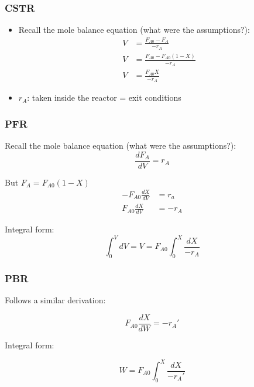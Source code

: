 \begin{frame}\frametitle{CSTR}
	\begin{itemize}
		\item	Recall the mole balance equation (what were the assumptions?):
				\begin{align*}
					V &= \frac{F_{A0} - F_A}{-r_A}\\
					V &= \frac{F_{A0} - F_{A0}(1 - X)}{-r_A} \\
					V &= \frac{F_{A0}X}{-r_A}
				\end{align*}
		\item	$r_A$: taken inside the reactor = exit conditions
	\end{itemize}
	{}
\end{frame}

\begin{frame}\frametitle{PFR}
	Recall the mole balance equation (what were the assumptions?):
	$$\frac{dF_A}{dV} = r_A$$

	But $F_A = F_{A0}(1 - X)$
	\begin{align*}
		-F_{A0}\frac{dX}{dV} &= r_a\\
		F_{A0}\frac{dX}{dV}&=-r_A
	\end{align*}

	Integral form:
	\vspace{-6pt}
	$$\int_0^VdV = V = F_{A0}\int_0^X\frac{dX}{-r_A}$$
	{}
\end{frame}

\begin{frame}\frametitle{PBR}
	Follows a similar derivation:
	
	$$F_{A0} \frac{dX}{dW} = -r_A'$$ 
	
	Integral form: 
	
	$$W = F_{A0}\int_0^X\frac{dX}{-r_A'}$$
	
	\vspace{24pt}
	{}
\end{frame}

